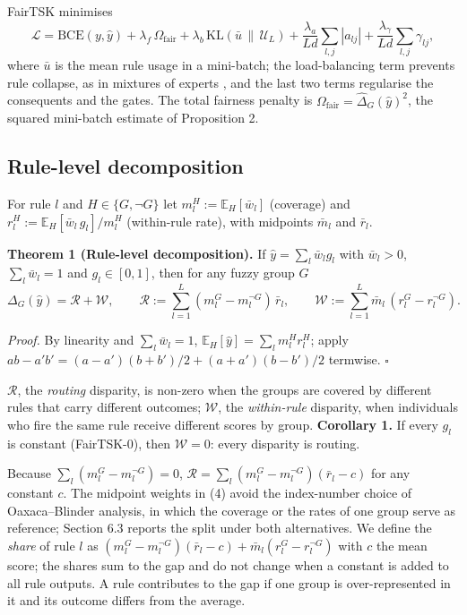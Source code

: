 \documentclass[pdflatex,sn-basic,Numbered,lineno]{sn-jnl}
\begin{document}
FairTSK minimises \[\mathcal{L} = \mathrm{BCE}(y,\hat{y}) + \lambda_{f}\,\Omega_{\text{fair}} + \lambda_{b}\,\mathrm{KL}(\bar{u}\,\|\,\mathcal{U}_{L}) + \frac{\lambda_{a}}{Ld}\sum_{l,j}|a_{lj}| + \frac{\lambda_{\gamma}}{Ld}\sum_{l,j}\gamma_{lj}, \tag{3}\] where \(\bar{u}\) is the mean rule usage in a mini-batch; the load-balancing term prevents rule collapse, as in mixtures of experts \cite{shazeer}, and the last two terms regularise the consequents and the gates. The total fairness penalty is \(\Omega_{\text{fair}} = \hat{\Delta}_{G}(\hat y)^{2}\), the squared mini-batch estimate of Proposition 2.

\hypertarget{rule-level-decomposition}{%
\subsection{Rule-level decomposition}\label{rule-level-decomposition}}

For rule \(l\) and \(H \in \{G,\neg G\}\) let \(m_{l}^{H} := \mathbb{E}_{H}[\bar{w}_{l}]\) (coverage) and \(r_{l}^{H} := \mathbb{E}_{H}[\bar{w}_{l}\, g_{l}]/m_{l}^{H}\) (within-rule rate), with midpoints \(\bar{m}_{l}\) and \(\bar{r}_{l}\).

\textbf{Theorem 1 (Rule-level decomposition).} If \(\hat y = \sum_l \bar w_l g_l\) with \(\bar w_l > 0\), \(\sum_l \bar w_l = 1\) and \(g_l \in [0,1]\), then for any fuzzy group \(G\) \[\Delta_{G}(\hat{y}) = \mathcal{R} + \mathcal{W},\qquad \mathcal{R} := \sum_{l = 1}^{L}(m_{l}^{G} - m_{l}^{\neg G})\,\bar{r}_{l},\qquad \mathcal{W} := \sum_{l = 1}^{L}\bar{m}_{l}\,(r_{l}^{G} - r_{l}^{\neg G}). \tag{4}\]

\emph{Proof.} By linearity and \(\sum_l \bar w_l = 1\), \(\mathbb{E}_{H}[\hat{y}] = \sum_{l}m_{l}^{H}r_{l}^{H}\); apply \(ab - a'b' = (a - a')(b + b')/2 + (a + a')(b - b')/2\) termwise. \(\square\)

\(\mathcal R\), the \emph{routing} disparity, is non-zero when the groups are covered by different rules that carry different outcomes; \(\mathcal W\), the \emph{within-rule} disparity, when individuals who fire the same rule receive different scores by group. \textbf{Corollary 1.} If every \(g_l\) is constant (FairTSK-0), then \(\mathcal W = 0\): every disparity is routing.

Because \(\sum_l (m_l^G - m_l^{\neg G}) = 0\), \(\mathcal R = \sum_l (m_l^G - m_l^{\neg G})(\bar r_l - c)\) for any constant \(c\). The midpoint weights in (4) avoid the index-number choice of Oaxaca--Blinder analysis, in which the coverage or the rates of one group serve as reference; Section 6.3 reports the split under both alternatives. We define the \emph{share} of rule \(l\) as \((m_l^G - m_l^{\neg G})(\bar r_l - c) + \bar m_l (r_l^G - r_l^{\neg G})\) with \(c\) the mean score; the shares sum to the gap and do not change when a constant is added to all rule outputs. A rule contributes to the gap if one group is over-represented in it and its outcome differs from the average.
\end{document}
